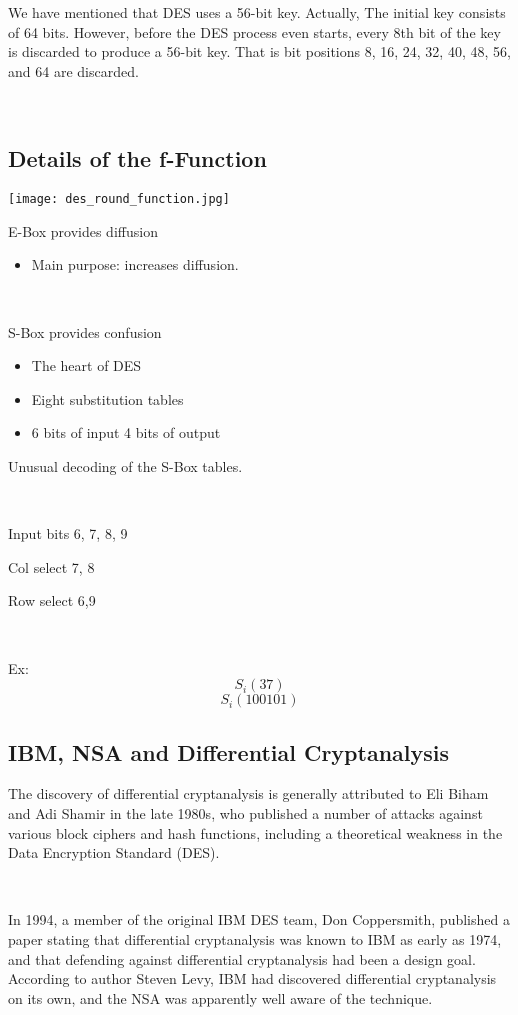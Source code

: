 \documentclass[twoside, twocolumn]{article}
\begin{document}
We have mentioned that DES uses a 56-bit key. Actually, The initial key consists of 64 bits. However, before the DES process even starts, every 8th bit of the key is discarded to produce a 56-bit key. That is bit positions 8, 16, 24, 32, 40, 48, 56, and 64 are discarded. 

\

\centering

\subsection{Details of the f-Function}

\texttt{[image: des\_round\_function.jpg]}

E-Box provides diffusion

\begin{itemize}
\item Main purpose: increases diffusion.
\end{itemize}
\

S-Box provides confusion

\begin{itemize}
\item The heart of DES
\item Eight substitution tables
\item 6 bits of input 4 bits of output
\end{itemize}

Unusual decoding of the S-Box tables.

\

Input bits 6, 7, 8, 9

Col select 7, 8

Row select 6,9

\

Ex: 
$$S_i(37)$$
$$S_i(100101)$$


\subsection{IBM, NSA and Differential Cryptanalysis}

The discovery of differential cryptanalysis is generally attributed to Eli Biham and Adi Shamir in the late 1980s, 
who published a number of attacks against various block ciphers and hash functions, 
including a theoretical weakness in the Data Encryption Standard (DES). 

\

In 1994, a member of the original IBM DES team, Don Coppersmith, published a paper stating that differential cryptanalysis was known to IBM as early as 1974, 
and that defending against differential cryptanalysis had been a design goal.
According to author Steven Levy, IBM had discovered differential cryptanalysis on its own, and the NSA was apparently well aware of the technique.
\end{document}
